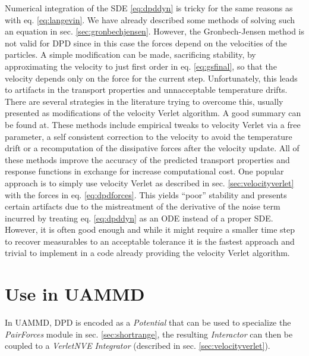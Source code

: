 \documentclass[ twoside,openright,titlepage,numbers=noenddot,%
headinclude,footinclude,cleardoublepage=empty,abstract=on,
BCOR=5mm,paper=a4,fontsize=11pt, dvipsnames
]{scrreprt}
\newcommand{\uammd}{\gls{UAMMD}\xspace}
\begin{document}
Numerical integration of the \gls{SDE} \eqref{eq:dpddyn} is tricky for the same reasons as with eq. \eqref{eq:langevin}. We have already described some methods of solving such an equation in sec. \ref{sec:gronbechjensen}. However, the Gronbech-Jensen method is not valid for \gls{DPD} since in this case the forces depend on the velocities of the particles. A simple modification can be made, sacrificing stability, by approximating the velocity to just first order in eq. \eqref{eq:gsfinal}, so that the velocity depends only on the force for the current step. Unfortunately, this leads to artifacts in the transport properties and unnacceptable temperature drifts. There are several strategies in the literature trying to overcome this, usually presented as modifications of the velocity Verlet algorithm. A good summary can be found at\cite{Leimhuler2015}. These methods include empirical tweaks to velocity Verlet via a free parameter\cite{Groot1997}, a self consistent correction to the velocity to avoid the temperature drift\cite{Pagonabarraga1998} or a recomputation of the dissipative forces after the velocity update\cite{Besold2000}.
All of these methods improve the accuracy of the predicted transport properties and response functions in exchange for increase computational cost. 
One popular approach is to simply use velocity Verlet as described in sec. \ref{sec:velocityverlet} with the forces in eq. \eqref{eq:dpdforces}. This yields ``poor'' stability and presents certain artifacts\cite{Besold2000} due to the mistreatment of the derivative of the noise term incurred by treating eq. \eqref{eq:dpddyn} as an \gls{ODE} instead of a proper \gls{SDE}. However, it is often good enough and while it might require a smaller time step to recover measurables to an acceptable tolerance it is the fastest approach and trivial to implement in a code already providing the velocity Verlet algorithm.
\section*{Use in UAMMD}
In \uammd, \gls{DPD} is encoded as a \emph{Potential} that can be used to specialize the \emph{PairForces} module in sec. \ref{sec:shortrange}, the resulting \emph{Interactor} can then be coupled to a \emph{VerletNVE} \emph{Integrator} (described in sec. \ref{sec:velocityverlet}).
\end{document}
